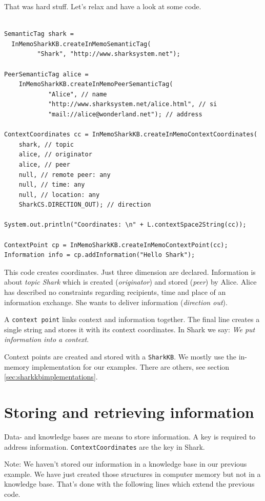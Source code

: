That was hard stuff. Let's relax and have a look at some code.

\begin{verbatim}

SemanticTag shark =
  InMemoSharkKB.createInMemoSemanticTag(
         "Shark", "http://www.sharksystem.net");

PeerSemanticTag alice =
    InMemoSharkKB.createInMemoPeerSemanticTag(
            "Alice", // name
            "http://www.sharksystem.net/alice.html", // si
            "mail://alice@wonderland.net"); // address

ContextCoordinates cc = InMemoSharkKB.createInMemoContextCoordinates(
    shark, // topic
    alice, // originator
    alice, // peer
    null, // remote peer: any
    null, // time: any
    null, // location: any
    SharkCS.DIRECTION_OUT); // direction

System.out.println("Coordinates: \n" + L.contextSpace2String(cc));

ContextPoint cp = InMemoSharkKB.createInMemoContextPoint(cc);
Information info = cp.addInformation("Hello Shark");
\end{verbatim}

This code creates coordinates. Just three dimension are declared. Information is about {\it topic Shark} which is created ({\it originator}) and stored ({\it peer}) by Alice. Alice has described no constraints regarding recipients, time and place of an information exchange. She wants to deliver information ({\it direction out}).

A {\tt context point} links context and information together. The final line creates a single string and stores it with its context coordinates. In Shark we say: {\it We put information into a context}.

Context points are created and stored with a {\tt SharkKB}. We mostly use the in-memory implementation for our examples. There are others, see section \ref{sec:sharkkbimplementations}.

\section{Storing and retrieving information}
Data- and knowledge bases are means to store information. A key is required to address information. {\tt ContextCoordinates} are the key in Shark.

Note: We haven't stored our information in a knowledge base in our previous example. We have just created those structures in computer memory but not in a knowledge base. That's done with the following lines which extend the previous code.

